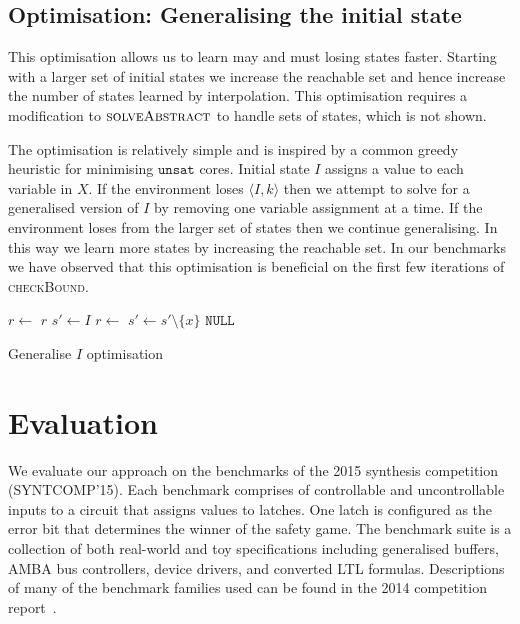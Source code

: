 \documentclass{llncs}
\begin{document}
\subsection{Optimisation: Generalising the initial state}

This optimisation allows us to learn may and must losing states faster.
Starting with a larger set of initial states we increase the reachable set and
hence increase the number of states learned by interpolation. This optimisation
requires a modification to $\textsc{solveAbstract}$ to handle sets of states,
which is not shown.

The optimisation is relatively simple and is inspired by a common greedy
heuristic for minimising $\texttt{unsat}$ cores. Initial state $I$ assigns a value to
each variable in $X$. If the environment loses $\langle I, k
\rangle$ then we attempt to solve for a generalised version of $I$ by removing
one variable assignment at a time. If the environment loses from the larger set of
states then we continue generalising. In this way we learn more
states by increasing the reachable set. In our benchmarks we have observed that
this optimisation is beneficial on the first few iterations of
\textsc{checkBound}.

\begin{algorithm}
    \begin{algorithmic}
            \State $r \gets $ 
             \Return $r$ \EndIIf
            \State $s' \gets I$
            \State $r \gets$  
                 $s' \gets s' \setminus \{x\}$ \EndIIf {}
            \EndFor
            \State \Return $\texttt{NULL}$
        \EndFunction
    \end{algorithmic}
    \caption{Generalise $I$ optimisation}
    \label{alg:opt1}
\end{algorithm}

\section{Evaluation}

We evaluate our approach on the benchmarks of the 2015 synthesis competition
(SYNTCOMP'15). Each benchmark comprises of controllable and uncontrollable
inputs to a circuit that assigns values to latches. One latch is configured as
the error bit that determines the winner of the safety game. The benchmark
suite is a collection of both real-world and toy specifications including
generalised buffers, AMBA bus controllers, device drivers, and converted LTL
formulas.  Descriptions of many of the benchmark families used can be found in
the 2014 competition report~\cite{jacobs2015}. 
\end{document}
